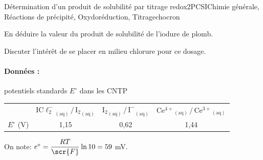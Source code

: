 \begin{exercise}{Détermination d'un produit de solubilité par titrage redox}{2}{PCSI}{Chimie générale, Réactions de précipité, Oxydoréduction, Titrage}{chocron}
\begin{questions}
\question En déduire la valeur du produit de solubilité de l'iodure de plomb. 

\question Discuter l'intérêt de se placer en milieu chlorure pour ce dosage.
\end{questions}

\paragraph{Données : } potentiels standards $E^\circ$ dans les CNTP
\begin{center}\begin{tabularx}{.7\linewidth}{rCCC}
    \hline
    & $\mathrm{{IC\ell_2^-}_{(aq)} \,/\, {I_2}_{(aq)}}$ & $\mathrm{{I_2}_{(aq)} \,/\, {I^-_{}}_{(aq)}}$ & $\mathrm{{Ce^{4+}}_{(aq)} \,/\, {Ce^{3+}}_{(aq)}}$ \\
    $E^\circ$ (V) & 1,15 & 0,62 & 1,44 \\ \hline\hline 
\end{tabularx}
\end{center}

On note: $e^\circ = \dfrac{RT}{\scr{F}} \ln10 = 59$ mV.

\end{exercise}

